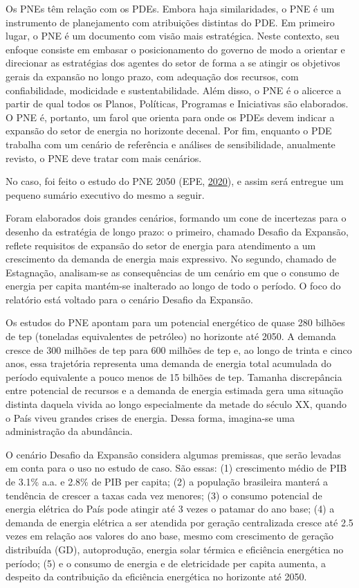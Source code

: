 \documentclass[grad,numbers]{coppe}
\begin{document}
  Os PNEs têm relação com os PDEs. Embora haja similaridades, o PNE é um instrumento de planejamento com atribuições distintas do PDE. Em primeiro lugar, o PNE é um documento com visão mais estratégica. Neste contexto, seu enfoque consiste em embasar o posicionamento do governo de modo a orientar e direcionar as estratégias dos agentes do setor de forma a se atingir os objetivos gerais da expansão no longo prazo, com adequação dos recursos, com confiabilidade, modicidade e sustentabilidade. Além disso, o PNE é o alicerce a partir de qual todos os Planos, Políticas, Programas e Iniciativas são elaborados. O PNE é, portanto, um farol que orienta para onde os PDEs devem indicar a expansão do setor de energia no horizonte decenal. Por fim, enquanto o PDE trabalha com um cenário de referência e análises de sensibilidade, anualmente revisto, o PNE deve tratar com mais cenários.

  No caso, foi feito o estudo do PNE 2050 (EPE, \protect\hyperlink{ref-epe2020}{2020}), e assim será entregue um pequeno sumário executivo do mesmo a seguir.

  Foram elaborados dois grandes cenários, formando um cone de incertezas para o desenho da estratégia de longo prazo: o primeiro, chamado Desafio da Expansão, reflete requisitos de expansão do setor de energia para atendimento a um crescimento da demanda de energia mais expressivo. No segundo, chamado de Estagnação, analisam-se as consequências de um cenário em que o consumo de energia per capita mantém-se inalterado ao longo de todo o período. O foco do relatório está voltado para o cenário Desafio da Expansão.

  Os estudos do PNE apontam para um potencial energético de quase 280 bilhões de tep (toneladas equivalentes de petróleo) no horizonte até 2050. A demanda cresce de 300 milhões de tep para 600 milhões de tep e, ao longo de trinta e cinco anos, essa trajetória representa uma demanda de energia total acumulada do período equivalente a pouco menos de 15 bilhões de tep. Tamanha discrepância entre potencial de recursos e a demanda de energia estimada gera uma situação distinta daquela vivida ao longo especialmente da metade do século XX, quando o País viveu grandes crises de energia. Dessa forma, imagina-se uma administração da abundância.

  O cenário Desafio da Expansão considera algumas premissas, que serão levadas em conta para o uso no estudo de caso. São essas: (1) crescimento médio de PIB de 3.1\% a.a. e 2.8\% de PIB per capita; (2) a população brasileira manterá a tendência de crescer a taxas cada vez menores; (3) o consumo potencial de energia elétrica do País pode atingir até 3 vezes o patamar do ano base; (4) a demanda de energia elétrica a ser atendida por geração centralizada cresce até 2.5 vezes em relação aos valores do ano base, mesmo com crescimento de geração distribuída (GD), autoprodução, energia solar térmica e eficiência energética no período; (5) e o consumo de energia e de eletricidade per capita aumenta, a despeito da contribuição da eficiência energética no horizonte até 2050.
\end{document}
